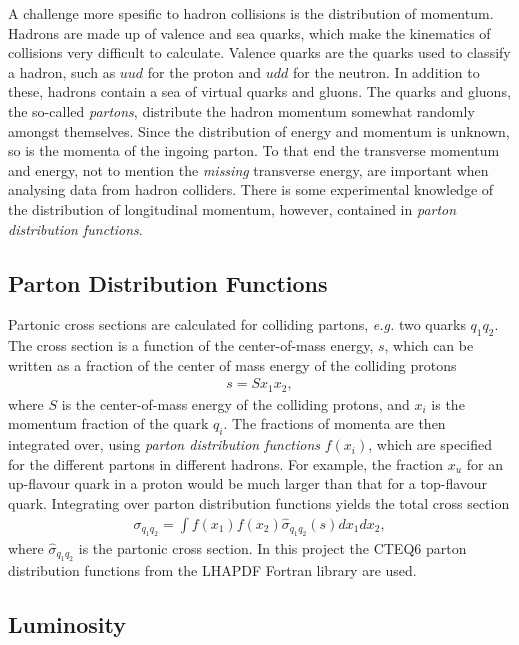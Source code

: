 \documentclass[twoside,english]{uiofysmaster}
\begin{document}
A challenge more spesific to hadron collisions is the distribution of momentum. Hadrons are made up of valence and sea quarks, which make the kinematics of collisions very difficult to calculate. Valence quarks are the quarks used to classify a hadron, such as $uud$ for the proton and $udd$ for the neutron. In addition to these, hadrons contain a sea of virtual quarks and gluons. The quarks and gluons, the so-called \textit{partons}, distribute the hadron momentum somewhat randomly amongst themselves. Since the distribution of energy and momentum is unknown, so is the momenta of the ingoing parton. To that end the transverse momentum and energy, not to mention the \textit{missing} transverse energy, are important when analysing data from hadron colliders. There is some experimental knowledge of the distribution of longitudinal momentum, however, contained in \textit{parton distribution functions}.

\subsection{Parton Distribution Functions}

Partonic cross sections are calculated for colliding partons, \textit{e.g.} two quarks $q_1 q_2$. The cross section is a function of the center-of-mass energy, $s$, which can be written as a fraction of the center of mass energy of the colliding protons
\begin{align}
s = S x_1 x_2,
\end{align}
where $S$ is the center-of-mass energy of the colliding protons, and $x_i$ is the momentum fraction of the quark $q_i$. The fractions of momenta are then integrated over, using \textit{parton distribution functions} $f(x_i)$, which are specified for the different partons in different hadrons. For example, the fraction $x_u$ for an up-flavour quark in a proton would be much larger than that for a top-flavour quark. Integrating over parton distribution functions yields the total cross section
\begin{align}
\sigma_{q_1q_2} = \int f(x_1) f(x_2) \hat{\sigma}_{q_1q_2}(s) dx_1 dx_2,
\end{align}
where $\hat{\sigma}_{q_1q_2}$ is the partonic cross section. In this project the CTEQ6 parton distribution functions from the LHAPDF Fortran library \cite{PhysRevD.78.013004} are used.

\subsection{Luminosity}
\end{document}
